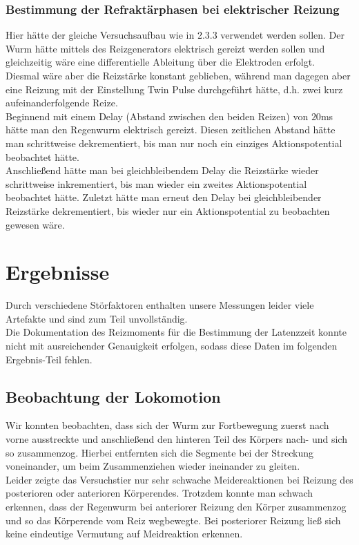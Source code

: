 \documentclass[11pt]{article}
\begin{document}
\subsubsection{Bestimmung der Refraktärphasen bei elektrischer Reizung}
Hier hätte der gleiche Versuchsaufbau wie in 2.3.3 verwendet werden sollen. Der Wurm hätte mittels des Reizgenerators elektrisch gereizt werden sollen und gleichzeitig wäre eine differentielle Ableitung über die Elektroden erfolgt. \\
Diesmal wäre aber die Reizstärke konstant geblieben, während man dagegen aber eine Reizung mit der Einstellung \glqq Twin Pulse\grqq{} durchgeführt hätte, d.h. zwei kurz aufeinanderfolgende Reize. \\
Beginnend mit einem Delay (Abstand zwischen den beiden Reizen) von $20$ms hätte man den Regenwurm elektrisch gereizt. Diesen zeitlichen Abstand hätte man schrittweise dekrementiert, bis man nur noch ein einziges Aktionspotential beobachtet hätte. \\
Anschließend hätte man bei gleichbleibendem Delay die Reizstärke wieder schrittweise inkrementiert, bis man wieder ein zweites Aktionspotential beobachtet hätte. Zuletzt hätte man erneut den Delay bei gleichbleibender Reizstärke dekrementiert, bis wieder nur ein Aktionspotential zu beobachten gewesen wäre. 


\section{Ergebnisse}
Durch verschiedene Störfaktoren enthalten unsere Messungen leider viele Artefakte und sind zum Teil unvollständig.  \\
Die Dokumentation des Reizmoments für die Bestimmung der Latenzzeit konnte nicht mit ausreichender Genauigkeit erfolgen, sodass diese Daten im folgenden Ergebnis-Teil fehlen. \\

\subsection{Beobachtung der Lokomotion}
Wir konnten beobachten, dass sich der Wurm zur Fortbewegung zuerst nach vorne ausstreckte und anschließend den hinteren Teil des Körpers nach- und sich so zusammenzog. Hierbei entfernten sich die Segmente bei der Streckung voneinander, um beim Zusammenziehen wieder ineinander zu gleiten.\\
Leider zeigte das Versuchstier nur sehr schwache Meidereaktionen bei Reizung des posterioren oder anterioren Körperendes. Trotzdem konnte man schwach erkennen, dass der Regenwurm bei anteriorer Reizung den Körper zusammenzog und so das Körperende vom Reiz wegbewegte. Bei posteriorer Reizung ließ sich keine eindeutige Vermutung auf Meidreaktion erkennen. 
\end{document}
